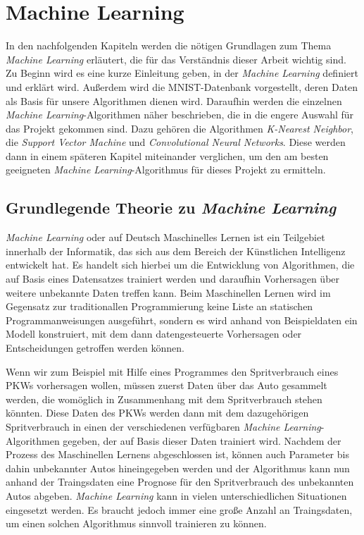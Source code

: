 \section{Machine Learning}
In den nachfolgenden Kapiteln werden die nötigen Grundlagen zum Thema \textit{Machine Learning} erläutert, die für das Verständnis dieser Arbeit wichtig sind.
Zu Beginn wird es eine kurze Einleitung geben, in der \textit{Machine Learning} definiert und erklärt wird. Außerdem wird die MNIST-Datenbank vorgestellt, deren
Daten als Basis für unsere Algorithmen dienen wird. Daraufhin werden die einzelnen \textit{Machine Learning}-Algorithmen näher beschrieben, die in die engere
Auswahl für das Projekt gekommen sind. Dazu gehören die Algorithmen \textit{K-Nearest Neighbor}, die \textit{Support Vector Machine} und \textit{Convolutional
Neural Networks}. Diese werden dann in einem späteren Kapitel miteinander verglichen, um den am besten geeigneten \textit{Machine Learning}-Algorithmus 
für dieses Projekt zu ermitteln.

\subsection{Grundlegende Theorie zu \textit{Machine Learning}}
\textit{Machine Learning} oder auf Deutsch Maschinelles Lernen ist ein Teilgebiet innerhalb der Informatik, das sich aus dem Bereich der Künstlichen Intelligenz
entwickelt hat. Es handelt sich hierbei um die Entwicklung von Algorithmen, die auf Basis eines Datensatzes trainiert werden und daraufhin Vorhersagen über
weitere unbekannte Daten treffen kann. Beim Maschinellen Lernen wird im Gegensatz zur traditionallen Programmierung keine Liste an statischen Programmanweisungen
ausgeführt, sondern es wird anhand von Beispieldaten ein Modell konstruiert, mit dem dann datengesteuerte Vorhersagen oder Entscheidungen getroffen werden
können.\cite{simon_2015}

Wenn wir zum Beispiel mit Hilfe eines Programmes den Spritverbrauch eines PKWs vorhersagen wollen, müssen zuerst Daten über das Auto gesammelt werden, die womöglich
in Zusammenhang mit dem Spritverbrauch stehen könnten. Diese Daten des PKWs werden dann mit dem dazugehörigen Spritverbrauch in einen der verschiedenen verfügbaren 
\textit{Machine Learning}-Algorithmen gegeben, der auf Basis dieser Daten trainiert wird. 
Nachdem der Prozess des Maschinellen Lernens abgeschlossen ist, können auch Parameter bis dahin unbekannter Autos hineingegeben werden und der Algorithmus kann nun
anhand der Traingsdaten eine Prognose für den Spritverbrauch des unbekannten Autos abgeben.
\textit{Machine Learning} kann in vielen unterschiedlichen Situationen eingesetzt werden. Es braucht jedoch immer eine große Anzahl an Traingsdaten, um einen
solchen Algorithmus sinnvoll trainieren zu können.


